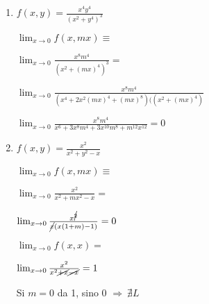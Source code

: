 \documentclass[../practica_03.tex]{subfiles}
\begin{document}
    \begin{enumerate}
        \item $f(x,y) = \frac{x^4y^4}{(x^2+y^4)^3}$

            $ \lim_{x \to 0 }  f(x,mx) \equiv $

            $ \lim_{x \to 0 } \frac{x^8m^4}{(x^2+(mx)^4)^3} = $

            $ \lim_{x \to 0 } \frac{x^8m^4}{(x^4+2x^2(mx)^4+(mx)^8)((x^2+(mx)^4)}$

            $ \lim_{x \to 0 } \frac{x^8m^4}{x^6+ 3x^8m^4 + 3x^{10}m^8 + m^{12}x^{12}} = 0$

        \item $f(x,y) = \frac{x^2}{x^2+y^2-x}$

            $ \lim_{x \to 0 }  f(x,mx) \equiv $

            $ \lim_{x \to 0 }  \frac{x^2}{x^2+mx^2-x} = $
            
            $ \lim_{x \to 0 }  \frac{x^{\cancel{2}}}{\cancel{x}(x(1+m)-1)} = 0 $
            
            $ \lim_{x \to 0 }  f(x, x) = $

            $ \lim_{x \to 0 }  \frac{x^2}{x^2\cancel{+x}\cancel{-x}} = 1$

            Si $m=0$ da 1, sino 0 $\Rightarrow \ \nexists L$

    \end{enumerate}
\end{document}
